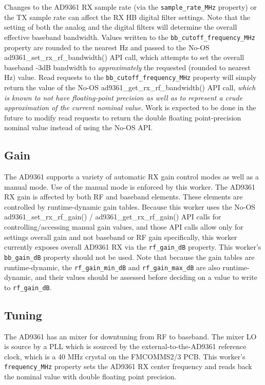 \documentclass{article}
\begin{document}
Changes to the AD9361 RX sample rate (via the \verb+sample_rate_MHz+ property) or the TX sample rate can affect the RX HB digital filter settings. Note that the setting of both the analog and the digital filters will determine the overall effective baseband bandwidth. Values written to the \verb+bb_cutoff_frequency_MHz+ property are rounded to the nearest Hz and passed to the No-OS ad9361\_set\_rx\_rf\_bandwidth() API call, which attempts to set the overall baseband -3dB bandwidth to \textit{approximately} the requested (rounded to nearest Hz) value. Read requests to the \verb+bb_cutoff_frequency_MHz+ property will simply return the value of the No-OS ad9361\_get\_rx\_rf\_bandwidth() API call, \textit{which is known to not have floating-point precision as well as to represent a crude approximation of the current nominal value}. Work is expected to be done in the future to modify read requests to return the double floating point-precision nominal value instead of using the No-OS API.
\subsection*{Gain}
The AD9361 supports a variety of automatic RX gain control modes as well as a manual mode. Use of the manual mode is enforced by this worker. The AD9361 RX gain is affected by both RF and baseband elements. These elements are controlled by runtime-dynamic gain tables. Because this worker uses the No-OS ad9361\_set\_rx\_rf\_gain() / ad9361\_get\_rx\_rf\_gain() API calls for controlling/accessing manual gain values, and those API calls allow only for settings overall gain and not baseband or RF gain specifically, this worker currently exposes overall AD9361 RX via the \verb+rf_gain_dB+ property. This worker's \verb+bb_gain_dB+ property should not be used. Note that because the gain tables are runtime-dynamic, the \verb+rf_gain_min_dB+ and \verb+rf_gain_max_dB+ are also runtime-dynamic, and their values should be assessed before deciding on a value to write to \verb+rf_gain_dB+.
\subsection*{Tuning}
The AD9361 has an mixer for downtuning from RF to baseband. The mixer LO is source by a PLL which is sourced by the external-to-the-AD9361 reference clock, which is a 40 MHz crystal on the FMCOMMS2/3 PCB. This worker's \verb+frequency_MHz+ property sets the AD9361 RX center frequency and reads back the nominal value with double floating point precision.
\end{document}
